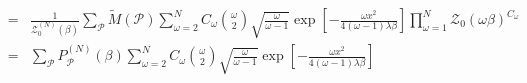 \documentclass[aps,preprint,showpacs,superscriptaddress,groupedaddress]{revtex4}  %
\begin{document}
\begin{eqnarray}
  &=& \frac{1}{\mathcal{Z}_{0}^{(N)}(\beta)} \sum_{\mathcal{P}} \tilde{M}(\mathcal{P}) \sum_{\omega=2}^{N} C_{\omega} \binom{\omega}{2} \sqrt{\frac{\omega}{\omega-1}}\exp{[-\frac{\omega x^{2}}{4(\omega-1)\lambda\beta}]} \prod_{\omega=1}^{N} \mathcal{Z}_{0}(\omega\beta)^{C_{\omega}} \\ 
  &=& \sum_{\mathcal{P}} P_{\mathcal{P}}^{(N)}(\beta) \sum_{\omega=2}^{N} C_{\omega} \binom{\omega}{2} \sqrt{\frac{\omega}{\omega-1}}\exp{[-\frac{\omega x^{2}}{4(\omega-1)\lambda\beta}]}
\end{eqnarray}

{}

%
\end{document}
